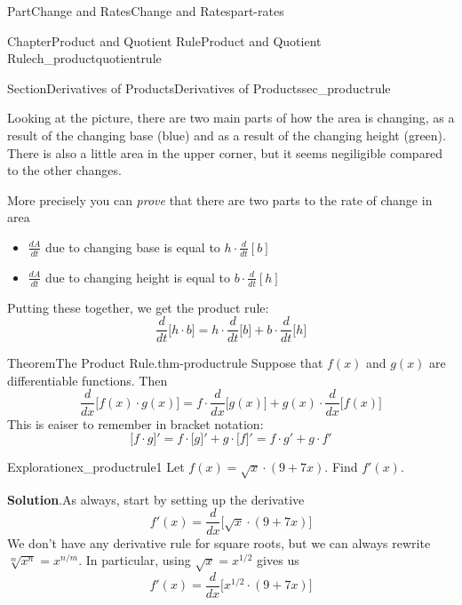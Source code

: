 \documentclass[oneside,10pt,]{tufte-book}
\newcommand{\blocktitlefont}{\relax}
\numberwithin{equation}{chapter}
\newcommand{\ddx}[1]{ \dfrac{d}{dx} \Big[ #1 \Big]  }
\begin{document}
\begin{partptx}{Part}{Change and Rates}{}{Change and Rates}{}{}{part-rates}
\begin{chapterptx}{Chapter}{Product and Quotient Rule}{}{Product and Quotient Rule}{}{}{ch_productquotientrule}
\begin{sectionptx}{Section}{Derivatives of Products}{}{Derivatives of Products}{}{}{sec_productrule}
\begin{image}{0.375}{0.25}{0.375}{}
{\begin{tikzpicture}
\end{tikzpicture}
}%
\end{image}%
Looking at the picture, there are two main parts of how the area is changing, as a result of the changing base (blue) and as a result of the changing height (green).  There is also a little area in the upper corner, but it seems negiligible compared to the other changes.%
\par
More precisely you can \emph{prove} that there are two parts to the rate of change in area%
\begin{itemize}[label=\textbullet]
\item{}\(\frac{dA}{dt}\) due to changing base is equal to \(h\cdot \frac{d}{dt}[b]\)%
\item{}\(\frac{dA}{dt}\) due to changing height is equal to \(b\cdot \frac{d}{dt}[h]\)%
\end{itemize}
Putting these together, we get the product rule:%
\begin{equation*}
\frac{d}{dt}\Big[h\cdot b\Big] = h\cdot \frac{d}{dt}\Big[b\Big] + b\cdot \frac{d}{dt}\Big[h\Big]
\end{equation*}
%
\begin{theorem}{Theorem}{The Product Rule.}{}{thm-productrule}%
Suppose that \(f(x)\) and \(g(x)\) are differentiable functions.  Then%
\begin{equation*}
\ddx{f(x)\cdot g(x)} = f\cdot \ddx{g(x)} + g(x) \cdot \ddx{f(x)}
\end{equation*}
This is eaiser to remember in bracket notation:%
\begin{equation*}
\Big[f\cdot g\Big]' = f\cdot \Big[g\Big]' + g\cdot \Big[f\Big]' 
= f\cdot g' + g\cdot f'
\end{equation*}
%
\end{theorem}
\begin{exploration}{Exploration}{}{ex_productrule1}%
Let \(f(x) = \sqrt{x} \cdot (9 + 7x) \). Find \(f'(x)\).%
\par\smallskip%
\noindent\textbf{\blocktitlefont Solution}.\hypertarget{ex_productrule1-2}{}\quad{}As always, start by setting up the derivative%
\begin{equation*}
f'(x) = \ddx{ \sqrt{x} \cdot (9 + 7x) } 
\end{equation*}
We don't have any derivative rule for square roots, but we can always rewrite \(\sqrt[m]{x^n} = x^{n/m}\).  In particular, using \(\sqrt{x} = x^{1/2}\) gives us%
\begin{equation*}
f'(x) = \ddx{ x^{1/2} \cdot (9 + 7x) } 
\end{equation*}

\end{exploration}
\end{sectionptx}
\end{chapterptx}
\end{partptx}
\end{document}
